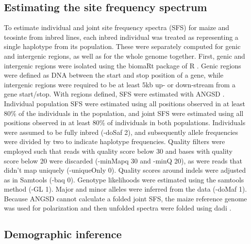 \documentclass{pnastwo}
\begin{document}
\begin{article}
\begin{materials}
\subsection{Estimating the site frequency spectrum}
To estimate individual  and joint site frequency spectra (SFS) for
maize and teosinte from inbred lines, each inbred individual was treated as representing
a single haplotype from its population. These were
separately computed for genic and intergenic regions, as well as for
the whole genome together. First, genic and intergenic regions were isolated using
the biomaRt package \cite{biomaRt1,biomaRt2} of R \cite{R}. Genic
regions were defined as DNA between the start and stop position of a
gene, while intergenic regions were required to be at least 5kb up- or
down-stream from a gene start/stop. With regions defined, SFS were
estimated with ANGSD \cite{angsd}. Individual population SFS were
estimated using all positions observed in at least 80\% of the
individuals in the population, and joint SFS were estimated using all
positions observed in at least 80\% of individuals in both
populations. Individuals were
assumed to be fully inbred (-doSaf 2), and subsequently allele frequencies were
divided by two to indicate haplotype frequencies. Quality filters were
employed such that reads with quality score below 30 and bases with
quality score below 20 were discarded (-minMapq 30 and -minQ 20), as were reads that didn't map
uniquely (-uniqueOnly 0). Quality scores around indels were adjusted
as in Samtools (-baq 0). Genotype likelihoods were estimated using the samtools
method (-GL 1). Major and minor alleles were inferred from the data
(-doMaf 1). Because ANGSD cannot calculate a folded joint SFS, the
maize reference genome was used for polarization and then unfolded spectra
were folded using dadi \cite{dadi}.

\subsection{Demographic inference}


\end{materials}
\end{article}
\end{document}
